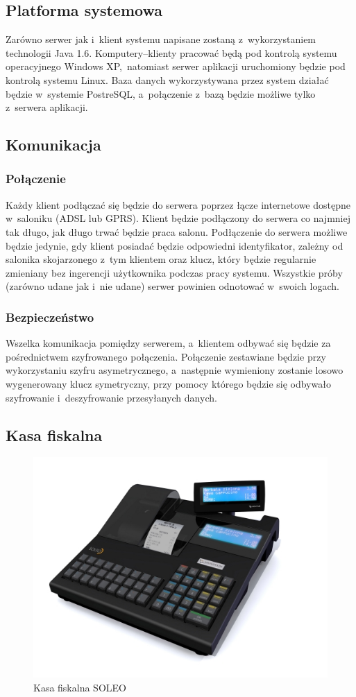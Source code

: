 \subsection{Platforma systemowa}
Zarówno serwer jak i~klient systemu napisane zostaną z~wykorzystaniem technologii Java 1.6. Komputery--klienty pracować będą pod kontrolą systemu operacyjnego Windows XP\texttrademark ,~natomiast serwer aplikacji uruchomiony będzie pod kontrolą systemu Linux. Baza danych wykorzystywana przez system działać będzie w~systemie PostreSQL, a~połączenie z~bazą będzie możliwe tylko z~serwera aplikacji.
\subsection{Komunikacja}
\subsubsection{Połączenie}
Każdy klient podłączać się będzie do serwera poprzez łącze internetowe dostępne w~saloniku (ADSL lub GPRS). Klient będzie podłączony do serwera co najmniej tak długo, jak długo trwać będzie praca salonu. Podłączenie do serwera możliwe będzie jedynie, gdy klient posiadać będzie odpowiedni identyfikator, zależny od salonika skojarzonego z~tym klientem oraz klucz, który będzie regularnie zmieniany bez ingerencji użytkownika podczas pracy systemu. Wszystkie próby (zarówno udane jak i~nie udane) serwer powinien odnotować w~swoich logach.
\subsubsection{Bezpieczeństwo}
Wszelka komunikacja pomiędzy serwerem, a~klientem odbywać się będzie za pośrednictwem szyfrowanego połączenia. Połączenie zestawiane będzie przy wykorzystaniu szyfru asymetrycznego, a~następnie wymieniony zostanie losowo wygenerowany klucz symetryczny, przy pomocy którego będzie się odbywało szyfrowanie i~deszyfrowanie przesyłanych danych.
\subsection{Kasa fiskalna}
\begin{figure}[h]
\includegraphics[width=1\textwidth]{gfx/SOLENO.jpg}
\caption{Kasa fiskalna SOLEO}
\end{figure}	
